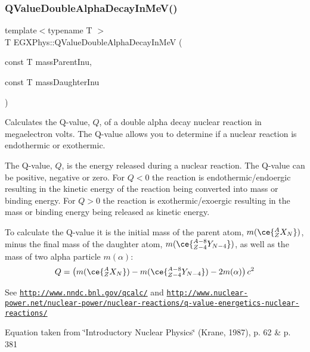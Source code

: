 \subsubsection{\texorpdfstring{Q\+Value\+Double\+Alpha\+Decay\+In\+Me\+V()}{QValueDoubleAlphaDecayInMeV()}}
{\footnotesize\ttfamily template$<$typename T $>$ \\
T E\+G\+X\+Phys\+::\+Q\+Value\+Double\+Alpha\+Decay\+In\+MeV (\begin{DoxyParamCaption}\item[{const T}]{mass\+Parent\+Inu,  }\item[{const T}]{mass\+Daughter\+Inu }\end{DoxyParamCaption})}



Calculates the Q-\/value, $Q$, of a double alpha decay nuclear reaction in megaelectron volts. The Q-\/value allows you to determine if a nuclear reaction is endothermic or exothermic. 

The Q-\/value, $Q$, is the energy released during a nuclear reaction. The Q-\/value can be positive, negative or zero. For $Q < 0$ the reaction is endothermic/endoergic resulting in the kinetic energy of the reaction being converted into mass or binding energy. For $Q > 0$ the reaction is exothermic/exoergic resulting in the mass or binding energy being released as kinetic energy.

To calculate the Q-\/value it is the initial mass of the parent atom, $m(\ce{ ^{A}_{Z}X_{N} })$, minus the final mass of the daughter atom, $m(\ce{ ^{A-8}_{Z-4}Y_{N-4} })$, as well as the mass of two alpha particle $m(\alpha)$\+: \[Q = \left ( m(\ce{ ^{A}_{Z}X_{N} })-m(\ce{ ^{A-8}_{Z-4}Y_{N-4} })-2m(\alpha) \right) c^2\]

See \href{http://www.nndc.bnl.gov/qcalc/}{\tt http\+://www.\+nndc.\+bnl.\+gov/qcalc/} and \href{http://www.nuclear-power.net/nuclear-power/nuclear-reactions/q-value-energetics-nuclear-reactions/}{\tt http\+://www.\+nuclear-\/power.\+net/nuclear-\/power/nuclear-\/reactions/q-\/value-\/energetics-\/nuclear-\/reactions/}

Equation taken from \char`\"{}\+Introductory Nuclear Physics\char`\"{} (Krane, 1987), p. 62 \& p. 381


